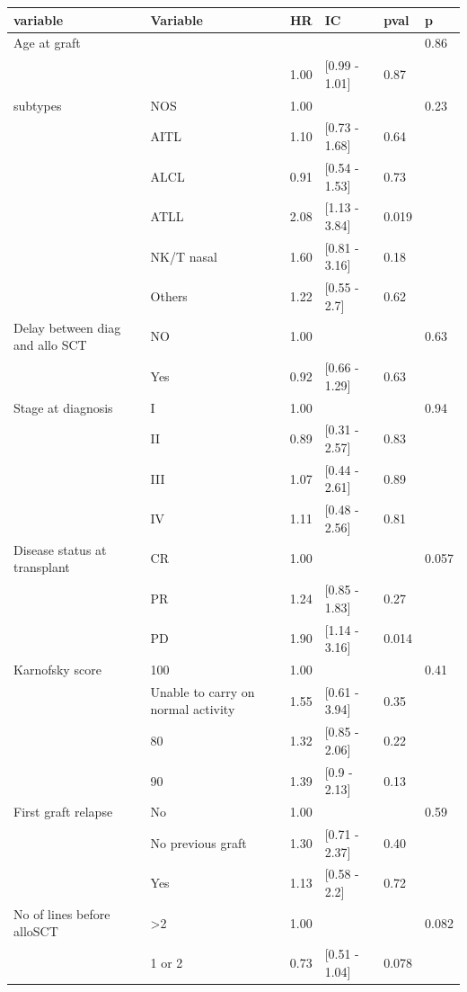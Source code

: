 \documentclass[a4paper,11pt] {article}
\begin{document}
\begin{center}
\begin{landscape}
\begin{longtable}{llrlll}
  \hline
variable & Variable & HR & IC & pval & p \\ 
  \hline
Age at graft &  &  &  &  & 0.86 \\ 
   &  & 1.00 & [0.99 - 1.01] & 0.87 &  \\ 
  subtypes & NOS & 1.00 &  &  & 0.23 \\ 
   & AITL & 1.10 & [0.73 - 1.68] & 0.64 &  \\ 
   & ALCL & 0.91 & [0.54 - 1.53] & 0.73 &  \\ 
   & ATLL & 2.08 & [1.13 - 3.84] & 0.019 &  \\ 
   & NK/T nasal & 1.60 & [0.81 - 3.16] & 0.18 &  \\ 
   & Others & 1.22 & [0.55 - 2.7] & 0.62 &  \\ 
  Delay between diag and allo SCT & NO & 1.00 &  &  & 0.63 \\ 
   & Yes & 0.92 & [0.66 - 1.29] & 0.63 &  \\ 
  Stage at diagnosis & I & 1.00 &  &  & 0.94 \\ 
   & II & 0.89 & [0.31 - 2.57] & 0.83 &  \\ 
   & III & 1.07 & [0.44 - 2.61] & 0.89 &  \\ 
   & IV & 1.11 & [0.48 - 2.56] & 0.81 &  \\ 
  Disease status at transplant & CR & 1.00 &  &  & 0.057 \\ 
   & PR & 1.24 & [0.85 - 1.83] & 0.27 &  \\ 
   & PD & 1.90 & [1.14 - 3.16] & 0.014 &  \\ 
  Karnofsky score & 100 & 1.00 &  &  & 0.41 \\ 
   & Unable to carry on normal activity & 1.55 & [0.61 - 3.94] & 0.35 &  \\ 
   & 80 & 1.32 & [0.85 - 2.06] & 0.22 &  \\ 
   & 90 & 1.39 & [0.9 - 2.13] & 0.13 &  \\ 
  First graft relapse & No & 1.00 &  &  & 0.59 \\ 
   & No previous graft & 1.30 & [0.71 - 2.37] & 0.40 &  \\ 
   & Yes & 1.13 & [0.58 - 2.2] & 0.72 &  \\ 
  No of lines before alloSCT & >2 & 1.00 &  &  & 0.082 \\ 
   & 1 or 2 & 0.73 & [0.51 - 1.04] & 0.078 &  \\ 

\end{longtable}
\end{landscape}
\end{center}
\end{document}
